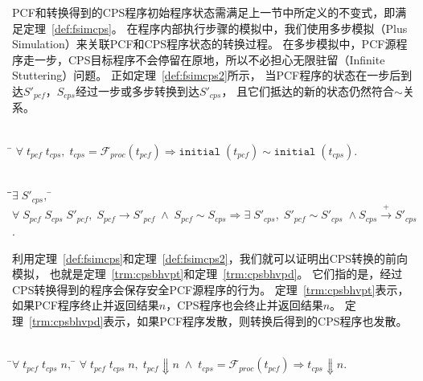 PCF和转换得到的CPS程序初始程序状态需满足上一节中所定义的不变式，即满足定理~\ref{def:fsimcps}。
在程序内部执行步骤的模拟中，我们使用多步模拟（Plus Simulation）来关联PCF和CPS程序状态的转换过程。
在多步模拟中，PCF源程序走一步，CPS目标程序不会停留在原地，所以不必担心无限驻留（Infinite Stuttering）问题。
正如定理~\ref{def:fsimcps2}所示，
当PCF程序的状态在一步后到达$S'_{pcf}$，$S_{cps}$经过一步或多步转换到达$S'_{cps}$，
且它们抵达的新的状态仍然符合$\sim$关系。

\begin{theorem}[CPS转换中初始状态的模拟]\label{def:fsimcps}
    \begin{tabbing}
      \\
    \quad\=\kill 
    \>$\forall\; t_{pcf} \; t_{cps},\;
       t_{cps}=\mathcal{F}_{proc}(t_{pcf})\Longrightarrow \mathtt{initial}\; (t_{pcf})
       \sim \mathtt{initial}\; (t_{cps}).$
    \end{tabbing}
\end{theorem}

\begin{theorem}[CPS转换中程序内部执行步骤的模拟]\label{def:fsimcps2}
    \begin{tabbing}
      \\
    \quad\=\qquad\=$\exists\; S'_{cps},\; $\=\kill
    \>$\forall \; S_{pcf}\; S_{cps}\; S'_{pcf},\; S_{pcf}\rightarrow S'_{pcf}\; \wedge \; S_{pcf}\sim S_{cps} \Longrightarrow \exists\; S'_{cps},\; S'_{pcf}\sim S'_{cps}\; \wedge
        S_{cps}\xrightarrow{+} S'_{cps}$.
    \end{tabbing}
\end{theorem}

利用定理~\ref{def:fsimcps}和定理~\ref{def:fsimcps2}，我们就可以证明出CPS转换的前向模拟，
也就是定理~\ref{trm:cpsbhvpt}和定理~\ref{trm:cpsbhvpd}。
它们指的是，经过CPS转换得到的程序会保存安全PCF源程序的行为。
定理~\ref{trm:cpsbhvpt}表示，如果PCF程序终止并返回结果$n$，CPS程序也会终止并返回结果$n$。
定理~\ref{trm:cpsbhvpd}表示，如果PCF程序发散，则转换后得到的CPS程序也发散。

\begin{theorem}[CPS程序对PCF程序终止行为的保存]\label{trm:cpsbhvpt} 
    \begin{tabbing}
     \\
    \quad\=$\forall \; t_{pcf}\; t_{cps}\; n,\; $\=\kill
    \>$\forall \; t_{pcf}\; t_{cps}\; n,\; t_{pcf}\Downarrow n\; \wedge \; t_{cps}=\mathcal{F}_{proc}(t_{pcf}) \Longrightarrow t_{cps}\Downarrow n.$
    \end{tabbing}
  \end{theorem}
  
